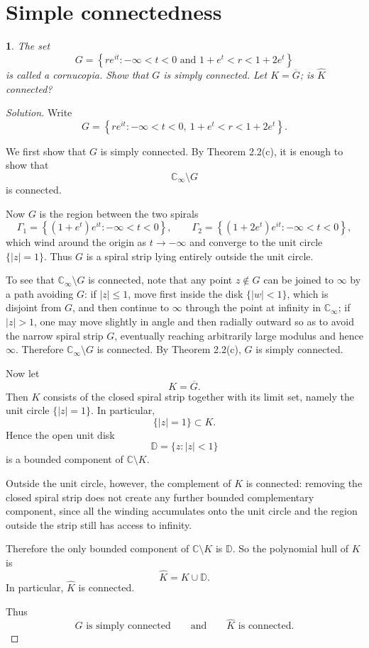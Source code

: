 \documentclass[12pt, a4paper]{report}
\theoremstyle{spaced}
\newtheorem{exercise}{}
\newcommand{\setexercise}[1]{\setcounter{exercise}{#1-1}}
\begin{document}
\section{Simple connectedness}
\setexercise{1}
\begin{exercise}
	The set
	\[
		G=\left\{re^{it}:-\infty<t<0 \text{ and } 1+e^t<r<1+2e^t\right\}
	\]
	is called a cornucopia. Show that $G$ is simply connected. Let $K=\overline{G}$; is $\widehat{K}$ connected?
\end{exercise}
\begin{proof}[Solution]
	Write
	\[
		G=\left\{re^{it}:-\infty<t<0,\ 1+e^t<r<1+2e^t\right\}.
	\]

	We first show that \(G\) is simply connected. By Theorem 2.2(c), it is enough to show that
	\[
		\mathbb C_\infty\setminus G
	\]
	is connected.

	Now \(G\) is the region between the two spirals
	\[
		\Gamma_1=\left\{(1+e^t)e^{it}:-\infty<t<0\right\},
		\qquad
		\Gamma_2=\left\{(1+2e^t)e^{it}:-\infty<t<0\right\},
	\]
	which wind around the origin as \(t\to -\infty\) and converge to the unit circle \(\{|z|=1\}\). Thus \(G\) is a spiral strip lying entirely outside the unit circle.

	To see that \(\mathbb C_\infty\setminus G\) is connected, note that any point \(z\notin G\) can be joined to \(\infty\) by a path avoiding \(G\):
	if \(|z|\le 1\), move first inside the disk \(\{|w|<1\}\), which is disjoint from \(G\), and then continue to \(\infty\) through the point at infinity in \(\mathbb C_\infty\);
	if \(|z|>1\), one may move slightly in angle and then radially outward so as to avoid the narrow spiral strip \(G\), eventually reaching arbitrarily large modulus and hence \(\infty\).
	Therefore \(\mathbb C_\infty\setminus G\) is connected. By Theorem 2.2(c), \(G\) is simply connected.

	Now let
	\[
		K=\overline{G}.
	\]
	Then \(K\) consists of the closed spiral strip together with its limit set, namely the unit circle \(\{|z|=1\}\). In particular,
	\[
		\{|z|=1\}\subset K.
	\]
	Hence the open unit disk
	\[
		\mathbb D=\{z:|z|<1\}
	\]
	is a bounded component of \(\mathbb C\setminus K\).

	Outside the unit circle, however, the complement of \(K\) is connected: removing the closed spiral strip does not create any further bounded complementary component, since all the winding accumulates onto the unit circle and the region outside the strip still has access to infinity.

	Therefore the only bounded component of \(\mathbb C\setminus K\) is \(\mathbb D\). So the polynomial hull of \(K\) is
	\[
		\widehat K = K\cup \mathbb D.
	\]
	In particular, \(\widehat K\) is connected.

	Thus
	\[
		G \text{ is simply connected}
		\qquad\text{and}\qquad
		\widehat K \text{ is connected}.
	\]
\end{proof}
\end{document}

